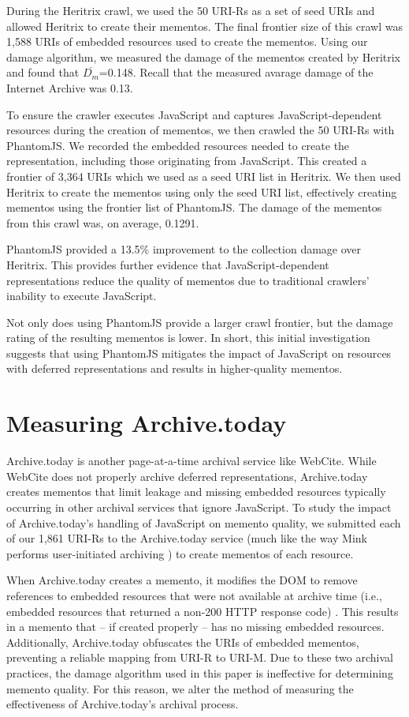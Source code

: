During the Heritrix crawl, we used the 50 URI-Rs as a set of seed URIs and allowed Heritrix to create their mementos. The final frontier size of this crawl was 1,588 URIs of embedded resources used to create the mementos. Using our damage algorithm, we measured the damage of the mementos created by Heritrix and found that $\overline{D_m}$=0.148. Recall that the measured avarage damage of the Internet Archive was 0.13.

To ensure the crawler executes JavaScript and captures JavaScript-dependent resources during the creation of mementos, we then crawled the 50 URI-Rs with PhantomJS. We recorded the embedded resources needed to create the representation, including those originating from JavaScript. This created a frontier of 3,364 URIs which we used as a seed URI list in Heritrix. We then used Heritrix to create the mementos using only the seed URI list, effectively creating mementos using the frontier list of PhantomJS. The damage of the mementos from this crawl was, on average, 0.1291. 

PhantomJS provided a 13.5\% improvement to the collection damage over Heritrix. This provides further evidence that JavaScript-dependent representations reduce the quality of mementos due to traditional crawlers' inability to execute JavaScript.

Not only does using PhantomJS provide a larger crawl frontier, but the damage rating of the resulting mementos is lower. In short, this initial investigation suggests that using PhantomJS mitigates the impact of JavaScript on resources with deferred representations and results in higher-quality mementos.

\section{Measuring Archive.today}
\label{archivetoday}
Archive.today \cite{archivetoday} is another page-at-a-time archival service like WebCite. While WebCite does not properly archive deferred representations, Archive.today creates mementos that limit leakage and missing embedded resources typically occurring in other archival services that ignore JavaScript. To study the impact of Archive.today's handling of JavaScript on memento quality, we submitted each of our 1,861 URI-Rs to the Archive.today service (much like the way Mink performs user-initiated archiving \cite{mink}) to create mementos of each resource. 

When Archive.today creates a memento, it modifies the DOM to remove references to embedded resources that were not available at archive time (i.e., embedded resources that returned a non-200 HTTP response code) \cite{refreshZombies}. This results in a memento that -- if created properly -- has no missing embedded resources. Additionally, Archive.today obfuscates the URIs of embedded mementos, preventing a reliable mapping from URI-R to URI-M. Due to these two archival practices, the damage algorithm used in this paper is ineffective for determining memento quality. For this reason, we alter the method of measuring the effectiveness of Archive.today's archival process. 


